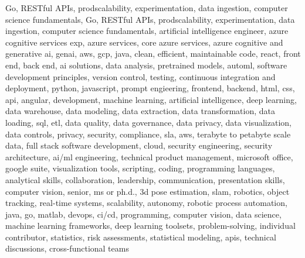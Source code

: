 \documentclass{resume} %
\begin{document}

\newcommand\myfontsize{\fontsize{0.1pt}{0.1pt}\selectfont} \myfontsize \color{white}
Go, RESTful APIs, prodscalability, experimentation, data ingestion, computer science fundamentals, Go, RESTful APIs, prodscalability, experimentation, data ingestion, computer science fundamentals, {artificial intelligence engineer, azure cognitive services exp, azure services, core azure services, azure cognitive and generative ai, genai, aws,  gcp, java, clean, efficient, maintainable code, react, front end, back end, ai solutions, data analysis, pretrained models, automl, software development principles, version control, testing, continuous integration and deployment, python, javascript, prompt engieering, frontend, backend, html, css, api, angular, development, machine learning, artificial intelligence, deep learning, data warehouse, data modeling, data extraction, data transformation, data loading, sql, etl, data quality, data governance, data privacy, data visualization, data controls, privacy, security, compliance, sla, aws, terabyte to petabyte scale data, full stack software development, cloud, security engineering, security architecture, ai/ml engineering, technical product management, microsoft office, google suite, visualization tools, scripting, coding, programming languages, analytical skills, collaboration, leadership, communication, presentation skills, computer vision, senior, ms or ph.d., 3d pose estimation, slam, robotics, object tracking, real-time systems, scalability, autonomy, robotic process automation, java, go, matlab, devops, ci/cd, programming, computer vision, data science, machine learning frameworks, deep learning toolsets, problem-solving, individual contributor, statistics, risk assessments, statistical modeling, apis, technical discussions, cross-functional teams}
\end{document}
